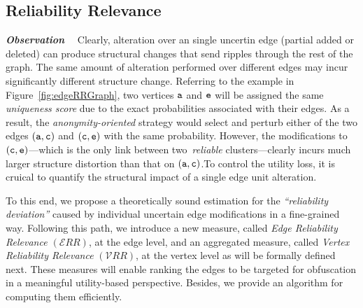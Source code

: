 \subsection{Reliability Relevance}

\textbf{\emph{Observation}}~~ 
Clearly, alteration over an single uncertin edge (partial added or deleted) can produce structural changes that send ripples through the rest of the graph. 
The same amount of alteration performed over different edges may incur significantly different structure change. 
Referring to the example in Figure~\ref{fig:edgeRRGraph}, two vertices $\tt{a}$ and $\tt{e}$ will be assigned the same {\em uniqueness score} due to the exact probabilities associated with their edges. 
As a result, the {\em anonymity-oriented} strategy would select and perturb either of the two edges $(\tt{a},\tt{c})$ and $(\tt{c},\tt{e})$ with the same probability. However, the modifications to $(\tt{c},\tt{e})$---which is the only link between two~\emph{reliable} clusters---clearly incurs much larger structure distortion than that on $(\tt{a},\tt{c})$.To control the utility loss, it is cruical to quantify the structural impact of a single edge unit alteration. 


To this end, we propose a theoretically sound estimation for the {\em ``reliability deviation''} caused by individual uncertain edge modifications in a fine-grained way. 
Following this path, we introduce a new measure, called {\em Edge Reliability Relevance $(\mathcal{E}RR)$}, at the edge level, and an aggregated measure, called {\em Vertex Reliability Relevance} $(\mathcal{V}RR)$, at the vertex level as will be formally defined next. These measures will enable ranking the edges to be targeted for obfuscation in a meaningful utility-based perspective. Besides, we provide an algorithm for computing them efficiently. 


